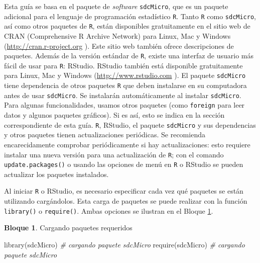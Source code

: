 \documentclass[
]{book}
\newenvironment{Shaded}{\begin{snugshade}}{\end{snugshade}}
\newcommand{\CommentTok}[1]{\textcolor[rgb]{0.56,0.35,0.01}{\textit{#1}}}
\newcommand{\FunctionTok}[1]{\textcolor[rgb]{0.00,0.00,0.00}{#1}}
\newcommand{\NormalTok}[1]{#1}
\theoremstyle{definition}
\theoremstyle{definition}
\newtheorem{example}{Bloque}[chapter]
\theoremstyle{definition}
\theoremstyle{definition}
\theoremstyle{remark}
\begin{document}
Esta guía se basa en el paquete de \emph{software} \texttt{sdcMicro}, que es un paquete adicional para el lenguaje de programación estadístico \texttt{R}. Tanto \texttt{R} como \texttt{sdcMicro}, así como otros paquetes de \texttt{R}, están disponibles gratuitamente en el sitio web de CRAN (Comprehensive R Archive Network) para Linux, Mac y Windows (\url{http://cran.r-project.org} ). Este sitio web también ofrece descripciones de paquetes. Además de la versión estándar de \texttt{R}, existe una interfaz de usuario más fácil de usar para \texttt{R}: RStudio. RStudio también está disponible gratuitamente para Linux, Mac y Windows (\url{http://www.rstudio.com} ). El paquete \texttt{sdcMicro} tiene dependencia de otros paquetes \texttt{R} que deben instalarse en su computadora antes de usar \texttt{sdcMicro}. Se instalarán automáticamente al instalar \texttt{sdcMicro}. Para algunas funcionalidades, usamos otros paquetes (como \texttt{foreign} para leer datos y algunos paquetes gráficos). Si es así, esto se indica en la sección correspondiente de esta guía. \texttt{R}, RStudio, el paquete \texttt{sdcMicro} y sus dependencias y otros paquetes tienen actualizaciones periódicas. Se recomienda encarecidamente comprobar periódicamente si hay actualizaciones: esto requiere instalar una nueva versión para una actualización de \texttt{R}; con el comando \texttt{update.packages()} o usando las opciones de menú en \texttt{R} o RStudio se pueden actualizar los paquetes instalados.

Al iniciar \texttt{R} o RStudio, es necesario especificar cada vez qué paquetes se están utilizando cargándolos. Esta carga de paquetes se puede realizar con la función \texttt{library()} o \texttt{require()}. Ambas opciones se ilustran en el Bloque \ref{exm:bloqueMicro1}.

\begin{example}
\protect\hypertarget{exm:bloqueMicro1}{}\label{exm:bloqueMicro1}Cargando paquetes requeridos
\end{example}

\begin{Shaded}
\begin{Highlighting}[]
\FunctionTok{library}\NormalTok{(sdcMicro) }\CommentTok{\# cargando paquete sdcMicro}
\FunctionTok{require}\NormalTok{(sdcMicro) }\CommentTok{\# cargando paquete sdcMicro}
\end{Highlighting}
\end{Shaded}
\end{document}
